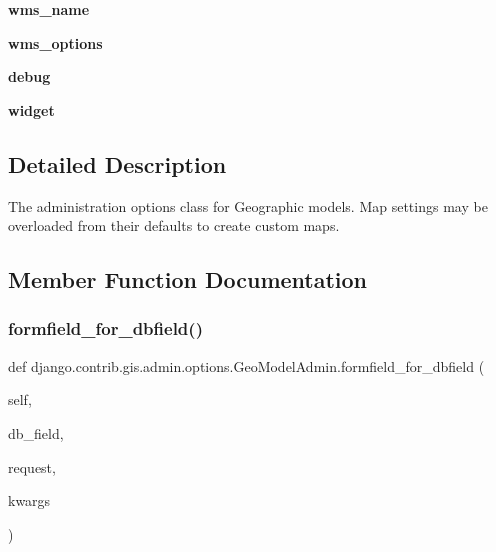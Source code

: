 \begin{DoxyCompactItemize}
{\bfseries wms\+\_\+name}
\item 
\mbox{\label{classdjango_1_1contrib_1_1gis_1_1admin_1_1options_1_1_geo_model_admin_abf9f3357a40457b880ec89ee55ea3fdd}} 
{\bfseries wms\+\_\+options}
\item 
\mbox{\label{classdjango_1_1contrib_1_1gis_1_1admin_1_1options_1_1_geo_model_admin_aee77ff77bc7d806be84dde7cdf2a41dd}} 
{\bfseries debug}
\item 
\mbox{\label{classdjango_1_1contrib_1_1gis_1_1admin_1_1options_1_1_geo_model_admin_a2607ff87c204e5297664f2de0f9ef39a}} 
{\bfseries widget}
\end{DoxyCompactItemize}


\subsection{Detailed Description}
\begin{DoxyVerb}The administration options class for Geographic models. Map settings
may be overloaded from their defaults to create custom maps.
\end{DoxyVerb}
 

\subsection{Member Function Documentation}
\mbox{\label{classdjango_1_1contrib_1_1gis_1_1admin_1_1options_1_1_geo_model_admin_aebf288ff57d5235d3031b7db6300fa57}} 
\subsubsection{\texorpdfstring{formfield\+\_\+for\+\_\+dbfield()}{formfield\_for\_dbfield()}}
{\footnotesize\ttfamily def django.\+contrib.\+gis.\+admin.\+options.\+Geo\+Model\+Admin.\+formfield\+\_\+for\+\_\+dbfield (\begin{DoxyParamCaption}\item[{}]{self,  }\item[{}]{db\+\_\+field,  }\item[{}]{request,  }\item[{}]{kwargs }\end{DoxyParamCaption})}


